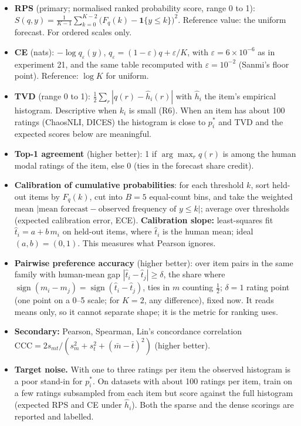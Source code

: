 \documentclass[10.5pt]{article}
\begin{document}
\begin{itemize}
\item \textbf{RPS} (primary; normalised ranked probability score, range 0 to 1): $S(q,y)=\frac1{K-1}\sum_{k=0}^{K-2}\bigl(F_q(k)-\mathbf 1\{y\le k\}\bigr)^2$. Reference value: the uniform forecast. For ordered scales only.
\item \textbf{CE} (nats): $-\log q_\varepsilon(y)$, $q_\varepsilon=(1-\varepsilon)q+\varepsilon/K$, with $\varepsilon=6\times10^{-6}$ as in experiment 21, and the same table recomputed with $\varepsilon=10^{-2}$ (Sanmi's floor point). Reference: $\log K$ for uniform.
\item \textbf{TVD} (range 0 to 1): $\tfrac12\sum_r|q(r)-\hat h_i(r)|$ with $\hat h_i$ the item's empirical histogram. Descriptive when $k_i$ is small (R6). When an item has about 100 ratings (ChaosNLI, DICES) the histogram is close to $p^\ast_i$ and TVD and the expected scores below are meaningful.
\item \textbf{Top-1 agreement} (higher better): 1 if $\arg\max_r q(r)$ is among the human modal ratings of the item, else 0 (ties in the forecast share credit).
\item \textbf{Calibration of cumulative probabilities}: for each threshold $k$, sort held-out items by $F_q(k)$, cut into $B=5$ equal-count bins, and take the weighted mean $|\text{mean forecast}-\text{observed frequency of }y\le k|$; average over thresholds (expected calibration error, ECE). \textbf{Calibration slope:} least-squares fit $\hat t_i=a+b\,m_i$ on held-out items, where $\hat t_i$ is the human mean; ideal $(a,b)=(0,1)$. This measures what Pearson ignores.
\item \textbf{Pairwise preference accuracy} (higher better): over item pairs in the same family with human-mean gap $|\hat t_i-\hat t_j|\ge\delta$, the share where $\operatorname{sign}(m_i-m_j)=\operatorname{sign}(\hat t_i-\hat t_j)$, ties in $m$ counting $\tfrac12$; $\delta=1$ rating point (one point on a 0--5 scale; for $K=2$, any difference), fixed now. It reads means only, so it cannot separate shape; it is the metric for ranking uses.
\item \textbf{Secondary:} Pearson, Spearman, Lin's concordance correlation $\mathrm{CCC}=2s_{mt}/(s_m^2+s_t^2+(\bar m-\bar t)^2)$ (higher better).
\item \textbf{Target noise.} With one to three ratings per item the observed histogram is a poor stand-in for $p^\ast_i$. On datasets with about 100 ratings per item, train on a few ratings subsampled from each item but score against the full histogram (expected RPS and CE under $\hat h_i$). Both the sparse and the dense scorings are reported and labelled.
\end{itemize}
\end{document}
